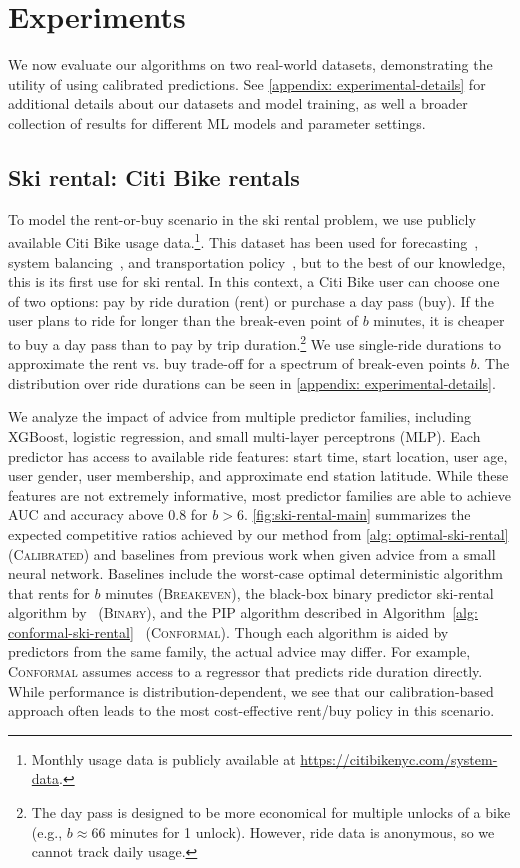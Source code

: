 \section{Experiments}
We now evaluate our algorithms on two real-world datasets, demonstrating the utility of using calibrated predictions. See \cref{appendix: experimental-details} for additional details about our datasets and model training, as well a broader collection of results for different ML models and parameter settings.
\subsection{Ski rental: Citi Bike rentals}
To model the rent-or-buy scenario in the ski rental problem, we use publicly available Citi Bike usage data.\footnote{Monthly usage data is publicly available at \url{https://citibikenyc.com/system-data}.}. This dataset has been used for forecasting~\citep{wang2016forecasting}, system balancing~\citep{o2015data}, and transportation policy~\citep{lei2021robust}, but to the best of our knowledge, this is its first use for ski rental. In this context, a Citi Bike user can choose one of two options: pay by ride duration (rent) or purchase a day pass (buy). If the user plans to ride for longer than the break-even point of $b$ minutes, it is cheaper to buy a day pass than to pay by trip duration.\footnote{The day pass is designed to be more economical for multiple unlocks of a bike (e.g., $b\approx66$ minutes for 1 unlock). However, ride data is anonymous, so we cannot track daily usage.} We use single-ride durations to approximate the rent vs. buy trade-off for a spectrum of break-even points $b$. The distribution over ride durations can be seen in \cref{appendix: experimental-details}. 

We analyze the impact of advice from multiple predictor families, including XGBoost, logistic regression, and small multi-layer perceptrons (MLP).
Each predictor has access to available ride features: start time, start location, user age, user gender, user membership, and approximate end station latitude. While these features are not extremely informative, most predictor families are able to achieve AUC and accuracy above 0.8 for $b>6$. \cref{fig:ski-rental-main} summarizes the expected competitive ratios achieved by our method from \cref{alg: optimal-ski-rental} (\textsc{Calibrated}) and baselines from previous work when given advice from a small neural network. Baselines include the worst-case optimal deterministic algorithm that rents for $b$ minutes \citep{Karlin88:Competitive} (\textsc{Breakeven}), the black-box binary predictor ski-rental algorithm by~\citet{Anand20:Customizing} (\textsc{Binary}), and the PIP algorithm described in Algorithm~\ref{alg: conformal-ski-rental}~\citep{Sun24:Online} (\textsc{Conformal}). Though each algorithm is aided by predictors from the same family, the actual advice may differ. For example, \textsc{Conformal} assumes access to a regressor that predicts ride duration directly. While performance is distribution-dependent, we see that our calibration-based approach often leads to the most cost-effective rent/buy policy in this scenario.

